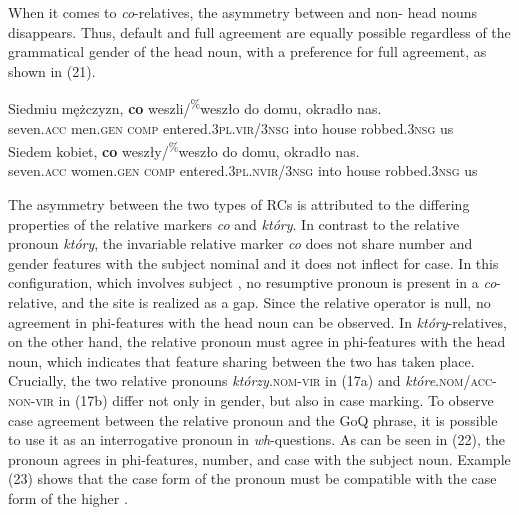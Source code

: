 \documentclass[output=paper]{langsci/langscibook}
\begin{document}
When it comes to \textit{co}{}-relatives, the asymmetry between  and non- head nouns disappears. Thus, default and full agreement are equally possible regardless of the grammatical gender of the head noun, with a preference for full agreement, as shown in (21).
 
\ea%
    \label{ex:leska:21}
    \ea
    \gll Siedmiu   mężczyzn,   \textbf{co}   weszli/\textsuperscript{\%}weszło     do domu, okradło     nas.\\
         seven.\textsc{acc}   men.\textsc{gen}   \textsc{comp}   entered.\textsc{3pl.vir}/\textsc{3nsg} into         house   robbed.\textsc{3nsg} us\\
    \ex
    \gll Siedem   kobiet,   \textbf{co}   weszły/\textsuperscript{\%}weszło    do   domu,   okradło     nas.      \\
         seven.\textsc{acc}   women.\textsc{gen}   \textsc{comp}   entered.\textsc{3pl.nvir/3nsg}    into   house     robbed.\textsc{3nsg} us \\
    \z
\z    

The asymmetry between the two types of RCs is attributed to the differing properties of the relative markers \textit{co} and \textit{który}. In contrast to the relative pronoun \textit{który}, the invariable relative marker \textit{co} does not share number and gender features with the subject nominal and it does not inflect for case. In this configuration, which involves subject , no resumptive pronoun is present in a \textit{co}{}-relative, and the  site is realized as a gap. Since the relative operator is null, no agreement in phi-features with the head noun can be observed. In \textit{który}{}-relatives, on the other hand, the relative pronoun must agree in phi-features with the head noun, which indicates that feature sharing between the two has taken place. Crucially, the two relative pronouns \textit{którzy}.\textsc{nom-vir} in (17a) and \textit{które}.\textsc{nom\slash acc-non-vir} in (17b) differ not only in gender, but also in case marking. To observe case agreement between the relative pronoun and the GoQ phrase, it is possible to use it as an interrogative pronoun in \textit{wh}{}-questions. As can be seen in (22), the pronoun agrees in phi-features, number, and case with the subject noun. Example (23) shows that the case form of the pronoun must be compatible with the case form of the higher .
\end{document}

